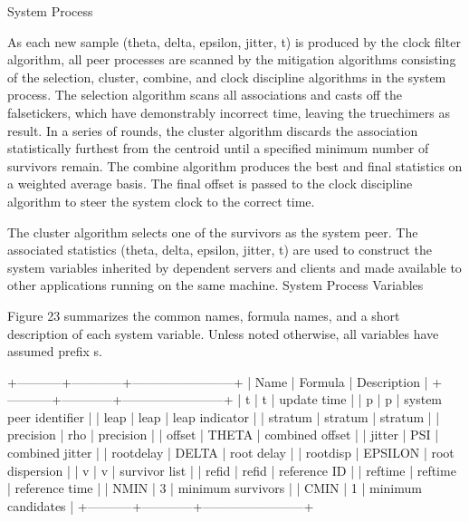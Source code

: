 System Process

   As each new sample (theta, delta, epsilon, jitter, t) is produced by
   the clock filter algorithm, all peer processes are scanned by the
   mitigation algorithms consisting of the selection, cluster, combine,
   and clock discipline algorithms in the system process.  The selection
   algorithm scans all associations and casts off the falsetickers,
   which have demonstrably incorrect time, leaving the truechimers as
   result.  In a series of rounds, the cluster algorithm discards the
   association statistically furthest from the centroid until a
   specified minimum number of survivors remain.  The combine algorithm
   produces the best and final statistics on a weighted average basis.
   The final offset is passed to the clock discipline algorithm to steer
   the system clock to the correct time.

   The cluster algorithm selects one of the survivors as the system
   peer.  The associated statistics (theta, delta, epsilon, jitter, t)
   are used to construct the system variables inherited by dependent
   servers and clients and made available to other applications running
   on the same machine.
    System Process Variables

   Figure 23 summarizes the common names, formula names, and a short
   description of each system variable.  Unless noted otherwise, all
   variables have assumed prefix s.

                +-----------+------------+------------------------+
                | Name      | Formula    | Description            |
                +-----------+------------+------------------------+
                | t         | t          | update time            |
                | p         | p          | system peer identifier |
                | leap      | leap       | leap indicator         |
                | stratum   | stratum    | stratum                |
                | precision | rho        | precision              |
                | offset    | THETA      | combined offset        |
                | jitter    | PSI        | combined jitter        |
                | rootdelay | DELTA      | root delay             |
                | rootdisp  | EPSILON    | root dispersion        |
                | v         | v          | survivor list          |
                | refid     | refid      | reference ID           |
                | reftime   | reftime    | reference time         |
                | NMIN      | 3          | minimum survivors      |
                | CMIN      | 1          | minimum candidates     |
                +-----------+------------+------------------------+

